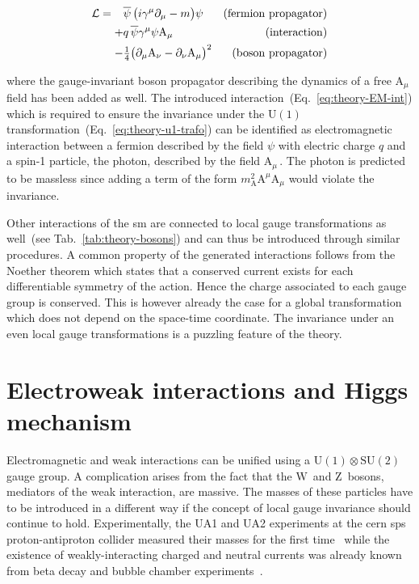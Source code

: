 \begin{subequations}
\begin{align}
\mathcal{L}=\hphantom{+}&\bar{\psi}\,\big(i\gamma^\mu\partial_\mu-m\big)\psi &(\mathrm{fermion~propagator}) \\
            +&q\,\bar{\psi}\gamma^{\mu}\psi \mathrm{A}_{\mu} &(\mathrm{interaction}) \label{eq:theory-EM-int}\\
            -&\tfrac{1}{4}\big(\partial_\mu \mathrm{A}_\nu-\partial_\nu \mathrm{A}_\mu\big)^{2} &(\mathrm{boson~propagator})
\end{align}
\end{subequations}

where the gauge-invariant boson propagator describing the dynamics of a free $\mathrm{A}_\mu$ field has been added as well. The introduced interaction~(Eq.~\ref{eq:theory-EM-int}) which is required to ensure the invariance under the $\mathrm{U(1)}$ transformation~(Eq.~\ref{eq:theory-u1-trafo}) can be identified as electromagnetic interaction between a fermion described by the field $\psi$ with electric charge $q$ and a spin-1 particle, the photon, described by the field $\mathrm{A}_\mu$\,. The photon is predicted to be massless since adding a term of the form $m^{2}_\mathrm{A}\mathrm{A}^\mu \mathrm{A}_\mu$ would violate the invariance.

Other interactions of the \gls{sm} are connected to local gauge transformations as well~(see Tab.~\ref{tab:theory-bosons}) and can thus be introduced through similar procedures. A common property of the generated interactions follows from the Noether theorem which states that a conserved current exists for each differentiable symmetry of the action. Hence the charge associated to each gauge group is conserved. This is however already the case for a global transformation which does not depend on the space-time coordinate. The invariance under an even local gauge transformations is a puzzling feature of the theory.



\section{Electroweak interactions and Higgs mechanism}
\label{sec:theory-ewk}

Electromagnetic and weak interactions can be unified using a $\mathrm{U(1)}\otimes \mathrm{SU(2)}$ gauge group. A complication arises from the fact that the $\mathrm{W}$~and $\mathrm{Z}$~bosons, mediators of the weak interaction, are massive. The masses of these particles have to be introduced in a different way if the concept of local gauge invariance should continue to hold. Experimentally, the UA1 and UA2 experiments at the \gls{cern} \gls{sps} proton-antiproton collider measured their masses for the first time~\cite{Arnison:1983rp,Banner:1983jy,Arnison:1983mk,Bagnaia:1983zx} while the existence of weakly-interacting charged and neutral currents was already known from beta decay and bubble chamber experiments~\cite{Hasert:1973ff}.

